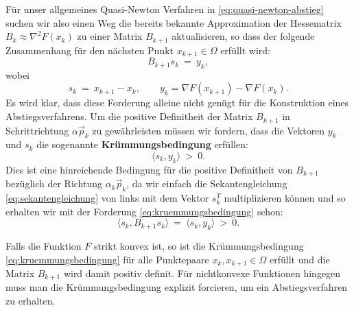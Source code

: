 Für unser allgemeines Quasi-Newton Verfahren in \eqref{eq:quasi-newton-abstieg} suchen wir also einen Weg die bereits bekannte Approximation der Hessematrix $B_k \approx \nabla^2F(x_k)$ zu einer Matrix $B_{k+1}$ aktualisieren, so dass der folgende Zusammenhang für den nächsten Punkt $x_{k+1} \in \Omega$ erfüllt wird:
\begin{equation}
\label{eq:sekantengleichung}
B_{k+1} s_k \ = \ y_k,
\end{equation}
wobei
\begin{equation*}
s_k \ = \ x_{k+1} - x_k, \qquad y_k = \nabla F(x_{k+1}) - \nabla F(x_k).
\end{equation*}
Es wird klar, dass diese Forderung alleine nicht genügt für die Konstruktion eines Abstiegsverfahrens.
Um die positive Definitheit der Matrix $B_{k+1}$ in Schrittrichtung $\alpha\vec{p}_k$ zu gewährleisten müssen wir fordern, dass die Vektoren $y_k$ und $s_k$ die sogenannte \textbf{Krümmungsbedingung} erfüllen:
\begin{equation}
\label{eq:kruemmungsbedingung}
\langle s_k, y_k \rangle \ > \ 0.
\end{equation}
Dies ist eine hinreichende Bedingung für die positive Definitheit von $B_{k+1}$ bezüglich der Richtung $\alpha_k \vec{p}_k$, da wir einfach die Sekantengleichung \eqref{eq:sekantengleichung} von links mit dem Vektor $s_k^T$ multiplizieren können und so erhalten wir mit der Forderung \eqref{eq:kruemmungsbedingung} schon:
\begin{equation*}
\langle s_k, B_{k+1}s_k \rangle \ = \ \langle s_k, y_k \rangle \ > \ 0.
\end{equation*}
\begin{remark}{}{}
Falls die Funktion $F$ strikt konvex ist, so ist die Krümmungsbedingung \eqref{eq:kruemmungsbedingung} für alle Punktepaare $x_k, x_{k+1} \in \Omega$ erfüllt und die Matrix $B_{k+1}$ wird damit positiv definit. Für nichtkonvexe Funktionen hingegen muss man die Krümmungsbedingung explizit forcieren, um ein Abstiegsverfahren zu erhalten.
\end{remark}

